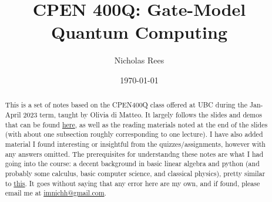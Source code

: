 \documentclass[11pt]{scrartcl}
\begin{document}
\title{CPEN 400Q: Gate-Model Quantum Computing}
\author{Nicholas Rees}
\date{\today}
\maketitle

\begin{abstract}
	This is a set of notes based on the CPEN400Q class offered at UBC
    during the Jan-April 2023 term, taught by Olivia di Matteo.
    It largely follows the slides and demos that can be found 
    \href{https://github.com/glassnotes/CPEN-400Q}{here},
    as well as the reading materials noted at the end of the slides
    (with about one subsection roughly corresponding to one lecture).
    I have also added material I found interesting or insightful from the quizzes/assignments,
    however with any answers omitted.
    The prerequisites for understandng these notes are what I had going into the course:
    a decent background in basic linear algebra and python
    (and probably some calculus, basic computer science, and classical physics),
    pretty similar to \href{https://codebook.xanadu.ai/T.1}{this}.
    It goes without saying that any error here are my own, and if found,
    please email me at \href{mailto:imnichh@gmail.com}{imnichh@gmail.com}.
\end{abstract}

\tableofcontents
\newpage


\end{document}
